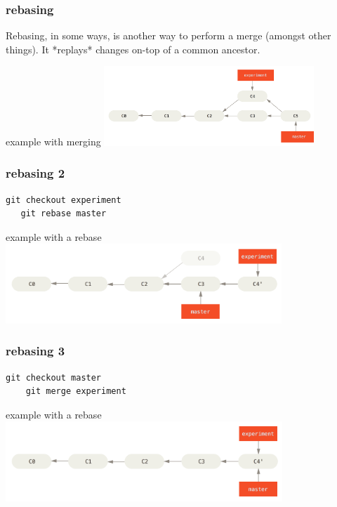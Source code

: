 \documentclass{beamer}
\begin{document}

\begin{frame}
  \frametitle{rebasing}
    Rebasing, in some ways, is another way to perform a merge (amongst other things). It *replays* changes on-top of a common ancestor.

  \begin{block}{example with merging}
    \includegraphics[height=3cm]{basic-rebase-2.png}
  \end{block}

\end{frame}

\begin{frame}[fragile]
  \frametitle{rebasing 2}
  
  \begin{lstlisting}[caption=rebase] 
   git checkout experiment
   git rebase master
  \end{lstlisting}

  \begin{block}{example with a rebase}
    \includegraphics[height=3cm]{basic-rebase-3.png}
  \end{block}

\end{frame}

\begin{frame}[fragile]
  \frametitle{rebasing 3}
  
  \begin{lstlisting}[caption=rebase] 
    git checkout master
    git merge experiment
  \end{lstlisting}

  \begin{block}{example with a rebase}
    \includegraphics[height=3cm]{basic-rebase-4.png}
  \end{block}

\end{frame}
\end{document}

